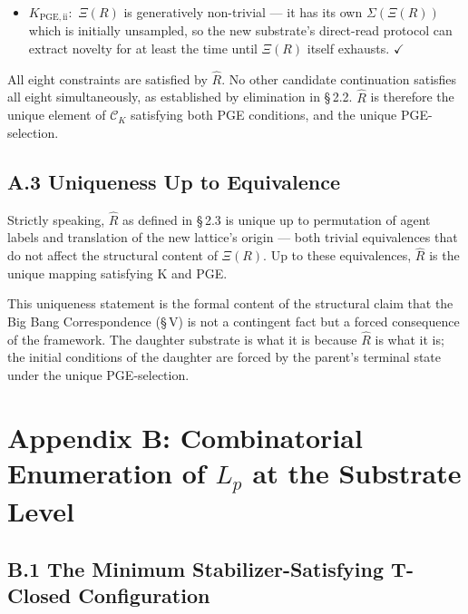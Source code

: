 \documentclass[11pt,oneside]{report}
\theoremstyle{definition}
\theoremstyle{remark}
\begin{document}
\begin{itemize}
\item
  \ensuremath{K_{\mathrm{PGE},\mathrm{ii}}:} \ensuremath{\Xi (R)} is generatively non-trivial --- it has its own
  \ensuremath{\Sigma (\Xi (R))} which is initially unsampled, so the new substrate's
  direct-read protocol can extract novelty for at least the time until
  \ensuremath{\Xi (R)} itself exhausts. \ensuremath{\checkmark}
\end{itemize}

All eight constraints are satisfied by \ensuremath{\hat{R}.} No other candidate
continuation satisfies all eight simultaneously, as established by
elimination in \S\,2.2. \ensuremath{\hat{R}} is therefore the unique element of \ensuremath{\mathcal{C}_{K}}
satisfying both PGE conditions, and the unique PGE-selection.

\subsection*{A.3 Uniqueness Up to Equivalence}

Strictly speaking, \ensuremath{\hat{R}} as defined in \S\,2.3 is unique up to permutation of
agent labels and translation of the new lattice's origin --- both
trivial equivalences that do not affect the structural content of \ensuremath{\Xi (R).}
Up to these equivalences, \ensuremath{\hat{R}} is the unique mapping satisfying K and PGE.

This uniqueness statement is the formal content of the structural claim
that the Big Bang Correspondence (\S\,V) is not a contingent fact but a
forced consequence of the framework. The daughter substrate is what it
is because \ensuremath{\hat{R}} is what it is; the initial conditions of the daughter are
forced by the parent's terminal state under the unique PGE-selection.

\section*{Appendix B: Combinatorial Enumeration of \ensuremath{L_{p}} at the Substrate Level}

\subsection*{B.1 The Minimum Stabilizer-Satisfying T-Closed Configuration}
\end{document}
